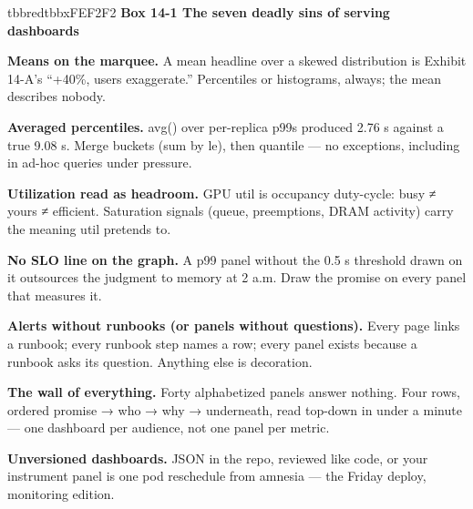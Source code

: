 \begin{calloutbox}{tbbred}{tbbxFEF2F2}
{\normalsize\bfseries\color{tbbx991B1B}Box 14-1  The seven deadly sins of serving dashboards}\par\vspace{3pt}
\begin{tbbitemize}
  \item \textbf{Means on the marquee.} A mean headline over a skewed distribution is Exhibit 14-A’s “+40\%, users exaggerate.” Percentiles or histograms, always; the mean describes nobody.
  \item \textbf{Averaged percentiles.} avg() over per-replica p99s produced 2.76 s against a true 9.08 s. Merge buckets (sum by le), then quantile — no exceptions, including in ad-hoc queries under pressure.
  \item \textbf{Utilization read as headroom.} GPU util is occupancy duty-cycle: busy ≠ yours ≠ efficient. Saturation signals (queue, preemptions, DRAM activity) carry the meaning util pretends to.
  \item \textbf{No SLO line on the graph.} A p99 panel without the 0.5 s threshold drawn on it outsources the judgment to memory at 2 a.m. Draw the promise on every panel that measures it.
  \item \textbf{Alerts without runbooks (or panels without questions).} Every page links a runbook; every runbook step names a row; every panel exists because a runbook asks its question. Anything else is decoration.
  \item \textbf{The wall of everything.} Forty alphabetized panels answer nothing. Four rows, ordered promise → who → why → underneath, read top-down in under a minute — one dashboard per audience, not one panel per metric.
  \item \textbf{Unversioned dashboards.} JSON in the repo, reviewed like code, or your instrument panel is one pod reschedule from amnesia — the Friday deploy, monitoring edition.
\end{tbbitemize}
\end{calloutbox}

